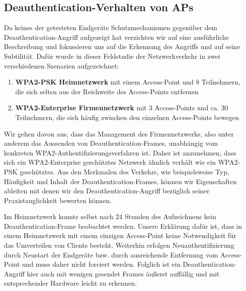 \subsection{Deauthentication-Verhalten von APs}
Da keines der getesteten Endgeräte Schutzmechanismen gegenüber dem Deauthentication-Angriff aufgezeigt hat verzichten wir auf eine ausführliche Beschreibung und fokussieren uns auf die Erkennung des Angriffs und auf seine Subtilität.
Dafür wurde in dieser Feldstudie der Netzwerkverkehr in zwei verschiedenen Szenarien aufgezeichnet:
\begin{enumerate}
	\item \textbf{WPA2-PSK Heimnetzwerk} mit einem Access-Point und 8 Teilnehmern, die sich selten aus der Reichweite des Access-Points entfernen
	\item \textbf{WPA2-Enterprise Firmennetzwerk} mit 3 Access-Points und ca. 30 Teilnehmern, die sich häufig zwischen den einzelnen Access-Points bewegen
\end{enumerate}
Wir gehen davon aus, dass das Management des Firmennetzwerks, also unter anderem das Aussenden von Deauthentication-Frames, unabhängig vom konkreten WPA2-Authentifizierungsverfahren ist.
Daher ist anzunehmen, dass sich ein WPA2-Enterprise geschütztes Netzwerk ähnlich verhält wie ein WPA2-PSK geschütztes.
Aus den Merkmalen des Verkehrs, wie beispielsweise Typ, Häufigkeit und Inhalt der Deauthentication-Frames, können wir Eigenschaften ableiten mit denen wir den Deauthentication-Angriff bezüglich seiner Praxistauglichkeit bewerten können.

Im Heimnetzwerk konnte selbst nach 24 Stunden des Aufzeichnens kein Deauthentication-Frame beobachtet werden.
Unsere Erklärung dafür ist, dass in einem Heimnetzwerk mit einem einzigen Access-Point keine Notwendigkeit für das Umverteilen von Clients besteht.
Weiterhin erfolgen Neuauthentifizierung durch Neustart der Endgeräte bzw. durch ausreichende Entfernung vom Access-Point und muss daher nicht forciert werden.
Folglich ist ein Deauthentication-Angriff hier auch mit wenigen gesendet Frames äußerst auffällig und mit entsprechender Hardware leicht zu erkennen.

